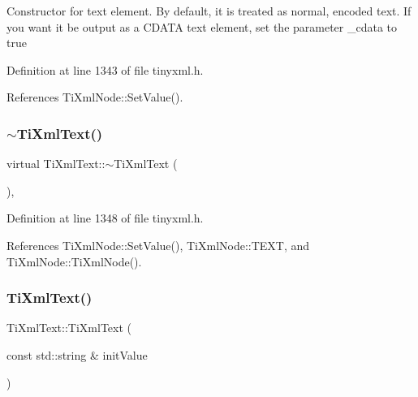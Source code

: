 Constructor for text element. By default, it is treated as normal, encoded text. If you want it be output as a C\+D\+A\+TA text element, set the parameter \+\_\+cdata to \textquotesingle{}true\textquotesingle{} 

Definition at line 1343 of file tinyxml.\+h.



References Ti\+Xml\+Node\+::\+Set\+Value().

\hypertarget{class_ti_xml_text_a829a4bd2d8d2461c333eb4f3f5b1b3d2}{}\label{class_ti_xml_text_a829a4bd2d8d2461c333eb4f3f5b1b3d2} 
\subsubsection{\texorpdfstring{$\sim$\+Ti\+Xml\+Text()}{~TiXmlText()}}
{\footnotesize\ttfamily virtual Ti\+Xml\+Text\+::$\sim$\+Ti\+Xml\+Text (\begin{DoxyParamCaption}{ }\end{DoxyParamCaption})\hspace{0.3cm}{\ttfamily [inline]}, {\ttfamily [virtual]}}



Definition at line 1348 of file tinyxml.\+h.



References Ti\+Xml\+Node\+::\+Set\+Value(), Ti\+Xml\+Node\+::\+T\+E\+XT, and Ti\+Xml\+Node\+::\+Ti\+Xml\+Node().

\hypertarget{class_ti_xml_text_a439792f6183a3d3fb6f2bc2b16fa5691}{}\label{class_ti_xml_text_a439792f6183a3d3fb6f2bc2b16fa5691} 
\subsubsection{\texorpdfstring{Ti\+Xml\+Text()}{TiXmlText()}\hspace{0.1cm}{\footnotesize\ttfamily [2/3]}}
{\footnotesize\ttfamily Ti\+Xml\+Text\+::\+Ti\+Xml\+Text (\begin{DoxyParamCaption}\item[{const std\+::string \&}]{init\+Value }\end{DoxyParamCaption})\hspace{0.3cm}{\ttfamily [inline]}}



